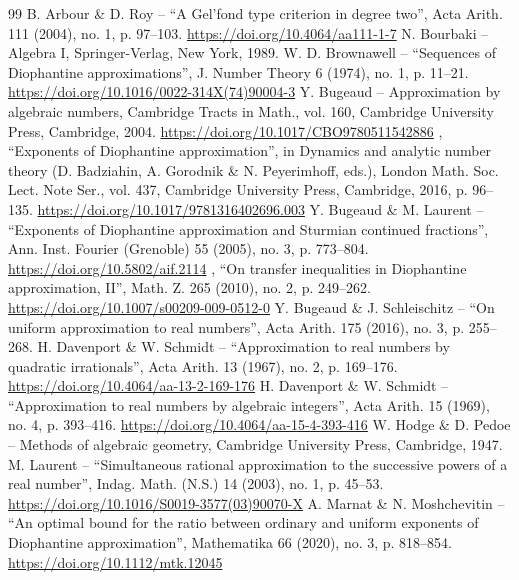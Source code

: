 \documentclass[10pt,a4paper]{amsart}
\numberwithin{equation}{section}
\theoremstyle{definition}
\theoremstyle{plain}
\begin{document}
\begin{thebibliography}{99}
 B. Arbour \& D. Roy – “A Gel’fond type criterion in degree two”, Acta Arith. 111 (2004), no. 1, p. 97–103. \url{https://doi.org/10.4064/aa111-1-7}
 N. Bourbaki – Algebra I, Springer-Verlag, New York, 1989. 
 W. D. Brownawell – “Sequences of Diophantine approximations”, J. Number Theory 6 (1974), no. 1, p. 11–21. \url{https://doi.org/10.1016/0022-314X(74)90004-3}
 Y. Bugeaud – Approximation by algebraic numbers, Cambridge Tracts in Math., vol. 160, Cambridge University Press, Cambridge, 2004. \url{https://doi.org/10.1017/CBO9780511542886}
 \textemdash{}, “Exponents of Diophantine approximation”, in Dynamics and analytic number theory (D. Badziahin, A. Gorodnik \& N. Peyerimhoff, eds.), London Math. Soc. Lect. Note Ser., vol. 437, Cambridge University Press, Cambridge, 2016, p. 96–135. \url{https://doi.org/10.1017/9781316402696.003}
 Y. Bugeaud \& M. Laurent – “Exponents of Diophantine approximation and Sturmian continued fractions”, Ann. Inst. Fourier (Grenoble) 55 (2005), no. 3, p. 773–804. \url{https://doi.org/10.5802/aif.2114}
 \textemdash{}, “On transfer inequalities in Diophantine approximation, II”, Math. Z. 265 (2010), no. 2, p. 249–262. \url{https://doi.org/10.1007/s00209-009-0512-0}
 Y. Bugeaud \& J. Schleischitz – “On uniform approximation to real numbers”, Acta Arith. 175 (2016), no. 3, p. 255–268.  
 H. Davenport \& W. Schmidt – “Approximation to real numbers by quadratic irrationals”, Acta Arith. 13 (1967), no. 2, p. 169–176. \url{https://doi.org/10.4064/aa-13-2-169-176}
 H. Davenport \& W. Schmidt – “Approximation to real numbers by algebraic integers”, Acta Arith. 15 (1969), no. 4, p. 393–416. \url{https://doi.org/10.4064/aa-15-4-393-416}
 W. Hodge \& D. Pedoe – Methods of algebraic geometry, Cambridge University Press, Cambridge, 1947. 
 M. Laurent – “Simultaneous rational approximation to the successive powers of a real number”, Indag. Math. (N.S.) 14 (2003), no. 1, p. 45–53. \url{https://doi.org/10.1016/S0019-3577(03)90070-X}
 A. Marnat \& N. Moshchevitin – “An optimal bound for the ratio between ordinary and uniform exponents of Diophantine approximation”, Mathematika 66 (2020), no. 3, p. 818–854. \url{https://doi.org/10.1112/mtk.12045}

\end{thebibliography}
\end{document}
